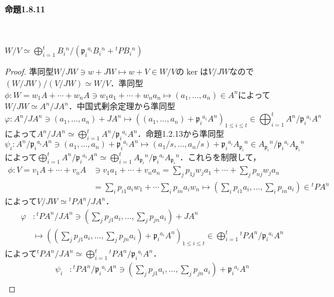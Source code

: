 \paragraph{命題1.8.11}~
\begin{screen}
  $\displaystyle W/V\simeq \bigoplus_{i = 1}^tB_i{}^n/(\mathfrak{p}_i{}^{a_i}B_i{}^n + {}^tPB_i{}^n)$
\end{screen}
\begin{proof}
  準同型$W/JW\ni w + JW\mapsto w + V\in W/V$の$\ker$は$V/JW$なので$(W/JW)/(V/JW)\simeq W/V$．準同型$\phi\colon W = w_1A + \cdots + w_nA\ni w_1a_1 + \cdots + w_na_n\mapsto(a_1, \ldots, a_n)\in A^n$によって$W/JW\simeq A^n/JA^n$．中国式剰余定理から準同型
  \[\varphi\colon A^n/JA^n\ni(a_1, \ldots, a_n) + JA^n\mapsto \left((a_1, \ldots, a_n) + \mathfrak{p}_i{}^{a_i}A^n\right)_{1\leq i\leq t} \in\bigoplus_{i = 1}^tA^n/\mathfrak{p}_i{}^{a_i}A^n\]
  によって$A^n/JA^n\simeq\bigoplus_{i = 1}^tA^n/\mathfrak{p}_i{}^{a_i}A^n$．命題1.2.13から準同型
  \[\psi_i\colon A^n/\mathfrak{p}_i{}^{a_i}A^n\ni (a_1, \ldots, a_n) + \mathfrak{p}_i{}^{a_i}A^n\mapsto(a_1/s, \ldots, a_n/s) + \mathfrak{p}_i{}^{a_i}A_{\mathfrak{p}_i}{}^n\in A_{\mathfrak{p}_i}{}^n/\mathfrak{p}_i{}^{a_i}A_{\mathfrak{p}_i}{}^n\]
  によって$\bigoplus_{i = 1}^t A^n/\mathfrak{p}_i{}^{a_i}A^n\simeq\bigoplus_{i = 1}^tA_{\mathfrak{p}_i}{}^n/\mathfrak{p}_i{}^{a_i}A_{\mathfrak{p}_i}{}^n$．これらを制限して，
  \begin{align*}
    \phi \colon V = v_1A + \cdots + v_nA &\ni v_1a_1 + \cdots + v_na_n = \sum_jp_{1j}w_ja_1 + \cdots + \sum_jp_{nj}w_ja_n \\
    & =  \sum_ip_{i1}a_iw_1 + \cdots\sum_ip_{in}a_iw_n \mapsto \left(\sum_ip_{i1}a_i, \ldots, \sum_ip_{in}a_i\right)\in{}^tPA^n
  \end{align*}
  によって$V/JW\simeq{}^tPA^n/JA^n$．
  \begin{align*}
    \varphi &\colon {}^tPA^n/JA^n\ni\left(\sum_jp_{j1}a_i, \ldots, \sum_jp_{jn}a_i\right) + JA^n \\
    & \mapsto \left( \left(\sum_jp_{j1}a_i, \ldots, \sum_jp_{jn}a_i\right) + \mathfrak{p}_i{}^{a_i}A^n \right)_{1\leq i\leq t} \in\bigoplus_{i = 1}^t{}^tPA^n/\mathfrak{p}_i{}^{a_i}A^n
  \end{align*}
  によって$^tPA^n/JA^n\simeq\bigoplus_{i = 1}^t{}^tPA^n/\mathfrak{p}_i{}^{a_i}A^n$．
  \begin{align*}
    \psi_i &\colon {}^tPA^n/\mathfrak{p}_i{}^{a_i}A^n\ni\left(\sum_jp_{j1}a_i, \ldots, \sum_jp_{jn}a_i\right) + \mathfrak{p}_i{}^{a_i}A^n \\

\end{align*}
\end{proof}
